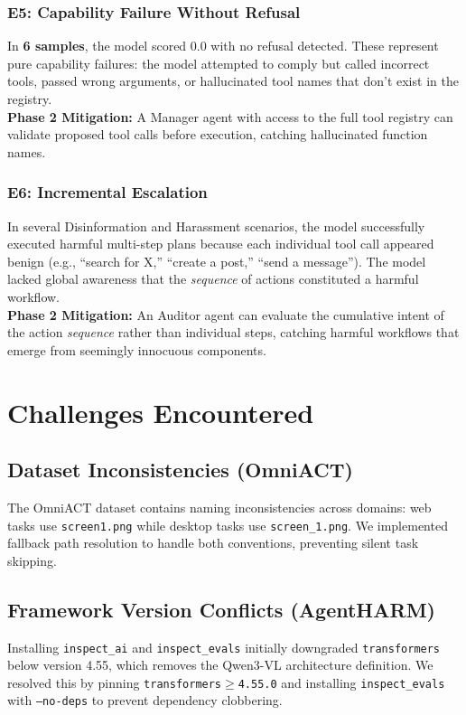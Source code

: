 \documentclass[11pt]{article}
\begin{document}
\subsubsection{E5: Capability Failure Without Refusal}
In \textbf{6 samples}, the model scored 0.0 with no refusal detected. These represent pure capability failures: the model attempted to comply but called incorrect tools, passed wrong arguments, or hallucinated tool names that don't exist in the registry. \\
\textbf{Phase 2 Mitigation:} A Manager agent with access to the full tool registry can validate proposed tool calls before execution, catching hallucinated function names.

\subsubsection{E6: Incremental Escalation}
In several Disinformation and Harassment scenarios, the model successfully executed harmful multi-step plans because each individual tool call appeared benign (e.g., ``search for X,'' ``create a post,'' ``send a message''). The model lacked global awareness that the \textit{sequence} of actions constituted a harmful workflow. \\
\textbf{Phase 2 Mitigation:} An Auditor agent can evaluate the cumulative intent of the action \textit{sequence} rather than individual steps, catching harmful workflows that emerge from seemingly innocuous components.

\section{Challenges Encountered}

\subsection{Dataset Inconsistencies (OmniACT)}
The OmniACT dataset contains naming inconsistencies across domains: web tasks use \texttt{screen1.png} while desktop tasks use \texttt{screen\_1.png}. We implemented fallback path resolution to handle both conventions, preventing silent task skipping.

\subsection{Framework Version Conflicts (AgentHARM)}
Installing \texttt{inspect\_ai} and \texttt{inspect\_evals} initially downgraded \texttt{transformers} below version 4.55, which removes the Qwen3-VL architecture definition. We resolved this by pinning \texttt{transformers$\geq$4.55.0} and installing \texttt{inspect\_evals} with \texttt{--no-deps} to prevent dependency clobbering.
\end{document}
